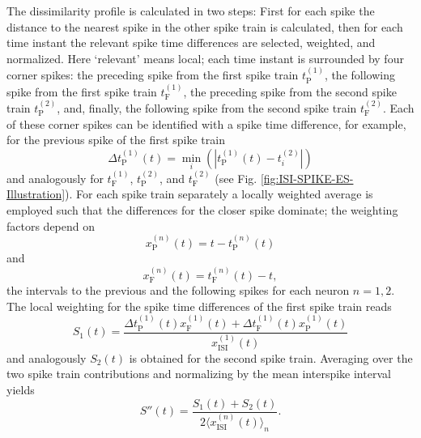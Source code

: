 \documentclass[10pt,twocolumn]{elsart5p}
\begin{document}
The dissimilarity profile is calculated in two steps: First for each spike the distance to the nearest spike in the other spike train is calculated, then for each time instant the relevant spike time differences are selected, weighted, and normalized. Here `relevant' means local; each time instant is surrounded by four corner spikes: the preceding spike from the first spike train $t_{\mathrm {P}}^{(1)}$, the following spike from the first spike train $t_{\mathrm {F}}^{(1)}$, the preceding spike from the second spike train $t_{\mathrm {P}}^{(2)}$, and, finally, the following spike from the second spike train $t_{\mathrm {F}}^{(2)}$. Each of these corner spikes can be identified with a spike time difference, for example, for the previous spike of the first spike train
%
\begin{equation} \label{eq:Delta-Corner-Spike}
     \Delta t_{\mathrm {P}}^{(1)} (t) = \min_i (| t_{\mathrm {P}}^{(1)} (t) - t_i^{(2)} |)
\end{equation}
%
and analogously for $t_{\mathrm {F}}^{(1)}$, $t_{\mathrm {P}}^{(2)}$, and $t_{\mathrm {F}}^{(2)}$  (see Fig. \ref{fig:ISI-SPIKE-ES-Illustration}). For each spike train separately a locally weighted average is employed such that the differences for the closer spike dominate; the weighting factors depend on
%
\begin{equation} \label{eq:Prev-Spike-Dist}
     x_{\mathrm {P}}^{(n)} (t) = t - t_{\mathrm {P}}^{(n)} (t)
\end{equation}
%
and
%
\begin{equation} \label{eq:Foll-Spike-Dist}
     x_{\mathrm {F}}^{(n)} (t) = t_{\mathrm {F}}^{(n)} (t) - t,
\end{equation}
%
the intervals to the previous and the following spikes for each neuron $n = 1, 2$. The local weighting for the spike time differences of the first spike train reads
%
\begin{equation} \label{eq:Bi-Spike-Diss-First}
     S_1 (t) = \frac{\Delta t_{\mathrm {P}}^{(1)} (t) x_{\mathrm {F}}^{(1)} (t) + \Delta t_{\mathrm {F}}^{(1)} (t) x_{\mathrm {P}}^{(1)} (t)}{x_{\mathrm {ISI}}^{(1)} (t)}
\end{equation}
%
and analogously $S_2 (t)$ is obtained for the second spike train. Averaging over the two spike train contributions and normalizing by the mean interspike interval yields
%
\begin{equation} \label{eq:Bi-Spike-Diss-Intermediate}
     S'' (t) = \frac{S_1 (t) + S_2 (t)}{2 \langle x_{\mathrm {ISI}}^{(n)} (t) \rangle_n}.
\end{equation}
\end{document}
